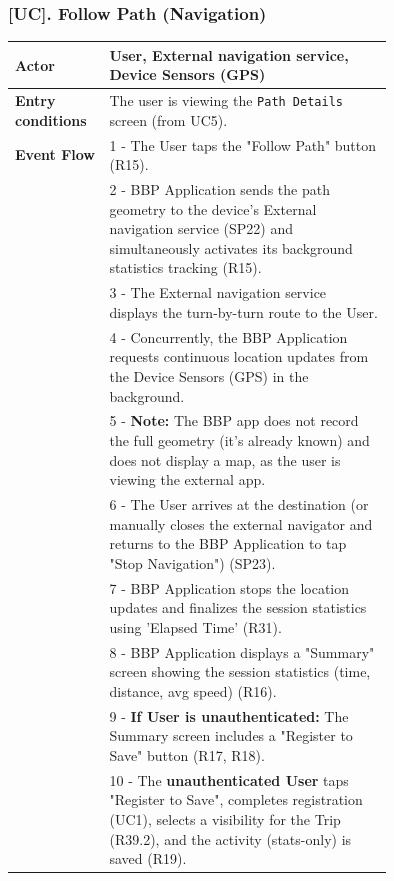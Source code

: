 \subsubsection*{[UC\cuc]. Follow Path (Navigation)}
\begin{center}
    \begin{longtable}{|l|p{0.75\linewidth}|}
    \hline
    \textbf{Actor}          & \textbf{User}, External navigation service, Device Sensors (GPS) \\
    \hline
    \textbf{Entry conditions} & The user is viewing the \texttt{Path Details} screen (from UC5). \\
    \hline
    \textbf{Event Flow}     & 1 - The User taps the "Follow Path" button (R15). \\
                            & 2 - BBP Application sends the path geometry to the device's External navigation service (SP22) and simultaneously activates its background statistics tracking (R15). \\
                            & 3 - The External navigation service displays the turn-by-turn route to the User. \\
                            & 4 - Concurrently, the BBP Application requests continuous location updates from the Device Sensors (GPS) in the background. \\
                            & 5 - \textbf{Note:} The BBP app does not record the full geometry (it's already known) and does not display a map, as the user is viewing the external app. \\
                            & 6 - The User arrives at the destination (or manually closes the external navigator and returns to the BBP Application to tap "Stop Navigation") (SP23). \\
                            & 7 - BBP Application stops the location updates and finalizes the session statistics using 'Elapsed Time' (R31). \\
                            & 8 - BBP Application displays a "Summary" screen showing the session statistics (time, distance, avg speed) (R16). \\
                            & 9 - \textbf{If User is unauthenticated:} The Summary screen includes a "Register to Save" button (R17, R18). \\
                            & 10 - The \textbf{unauthenticated User} taps "Register to Save", completes registration (UC1), selects a visibility for the Trip (R39.2), and the activity (stats-only) is saved (R19). \\

\end{longtable}
\end{center}
